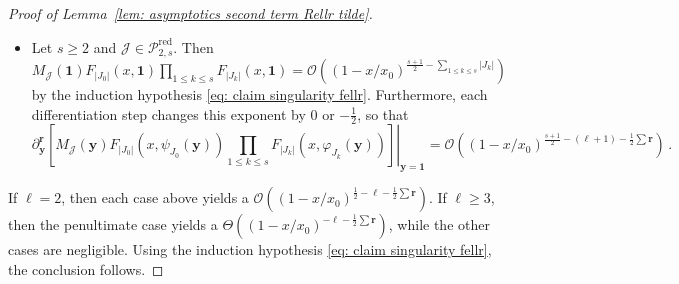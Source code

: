 \documentclass[10pt,a4paper]{amsart}
\newcommand{\abs}[1]{{\left|#1\right|}}
\newcommand{\br}{{\mathbf{r}}}
\newcommand{\by}{{\mathbf{y}}}
\newcommand{\cJ}{\mathcal{J}}
\newcommand{\cO}{\mathcal{O}}
\newcommand{\cP}{\mathcal{P}}
\newcommand{\pairs}{{\rm B}}
\newcommand{\red}{\mathrm{red}}
\begin{document}
\begin{proof}[Proof of Lemma~\ref{lem: asymptotics second term Rellr tilde}]
\begin{itemize}
\begin{itemize}
        Here, the derivative is with respect to the argument of $F_{\abs{J_1}}$ indexed by $\{i,j\}$, where we identify $[0,\abs{J_1}]$ with $\{0\} \sqcup J_1$.
    \end{itemize}
    In the end we get, with the notation of the lemma,
    \begin{multline*}
        \partial_\by^\br {\left. \left[ M_\cJ(\by) F_{\abs{J_0}}\left( x,\psi_{J_0}(\by) \right) F_{\abs{J_1}}\left( x,\varphi_{J_1}(\by) \right) \right] \right\vert_{\by=\bm{1}} } 
        \\\sim
        \sum_{\substack{ \bm{0}\preceq \bm{\alpha}\preceq \br \\ \alpha_{i,j}=r_{i,j} \text{ for all } i,j\in J_0 \\ \alpha_{i,j}=0 \text{ for all } i,j\in J_1}}
        \binom{\br}{\bm{\alpha}}
        f_{\abs{J_0}, \bm\alpha^{J_0,\ell+1}}(x)
        f_{\abs{J_1}, (\br-\bm\alpha)^{0,J_1}}(x) 
    \end{multline*}
    \item Let $s\ge2$ and $\cJ\in\cP_{2,s}^\red$.
    Then $M_\cJ(\bm{1}) F_{\abs{J_0}}(x,\bm{1}) \prod_{1\le k\le s} F_{\abs{J_k}}(x,\bm{1}) = \cO\left( (1-x/x_0)^{\frac{s+1}{2}-\sum_{1\le k\le s}\abs{J_k}} \right)$ by the induction hypothesis \eqref{eq: claim singularity fellr}.
    Furthermore, each differentiation step changes this exponent by $0$ or $-\frac12$, so that
    \[
        \partial_\by^\br \left. \left[ M_\cJ(\by) F_{\abs{J_0}}\left( x,\psi_{J_0}(\by) \right) \prod_{1\le k\le s} F_{\abs{J_k}}\left( x,\varphi_{J_k}(\by) \right) \right] \right\vert_{\by=\bm{1}} 
        = \cO\left( (1-x/x_0)^{\frac{s+1}{2}-(\ell+1)-\frac12\sum\br} \right) \,.
    \]
\end{itemize}
If $\ell=2$, then each case above yields a $\cO\left( (1-x/x_0)^{\frac12-\ell-\frac12\sum\br} \right)$.
If $\ell\ge3$, then the penultimate case yields a $\Theta\left( (1-x/x_0)^{-\ell-\frac12\sum\br} \right)$, while the other cases are negligible.
Using the induction hypothesis \eqref{eq: claim singularity fellr}, the conclusion follows.
\end{proof}
\end{document}
